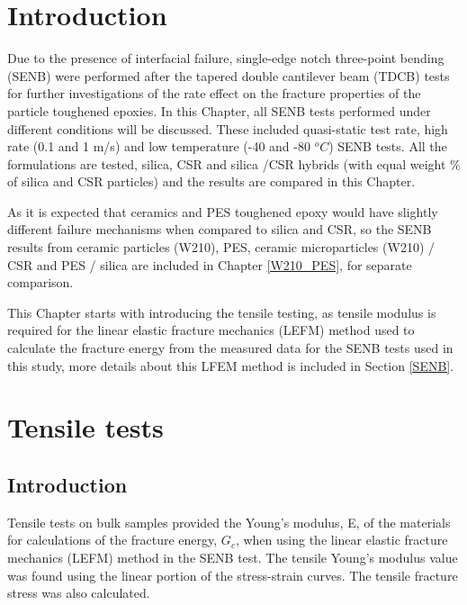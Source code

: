 \documentclass[numbers=noendperiod,chapterprefix=on]{icldt} %
\begin{document}
\section{Introduction}
Due to the presence of interfacial failure, single-edge notch three-point bending (SENB) were performed after the tapered double cantilever beam (TDCB) tests for further investigations of the rate effect on the fracture properties of the particle toughened epoxies.  
In this Chapter, all SENB tests performed under different conditions will be discussed. These included quasi-static test rate, high rate (0.1 and 1 m/s) and low temperature (-40 and -80 $^oC$) SENB tests. All the formulations are tested, silica, CSR and silica /CSR hybrids (with equal weight \% of silica and CSR particles) and the results are compared in this Chapter. 

As it is expected that ceramics and PES toughened epoxy would have slightly different failure mechanisms when compared to silica and CSR, so the SENB results from ceramic particles (W210), PES, ceramic microparticles (W210) / CSR and PES / silica are included in Chapter \ref{W210_PES}, for separate comparison.
 
This Chapter starts with introducing the tensile testing, as tensile modulus is required for the linear elastic fracture mechanics (LEFM) method used to calculate the fracture energy from the measured data for the SENB tests used in this study, more details about this LFEM method is included in Section \ref{SENB}.

\section{Tensile tests}

\subsection{Introduction}
Tensile tests on bulk samples provided the Young's modulus, E, of the materials for calculations of the fracture energy, $G_c$, when using the linear elastic fracture mechanics (LEFM) method in the SENB test. The tensile Young's modulus value was found using the linear portion of the stress-strain curves. The tensile fracture stress was also calculated. 


%
%
\end{document}

